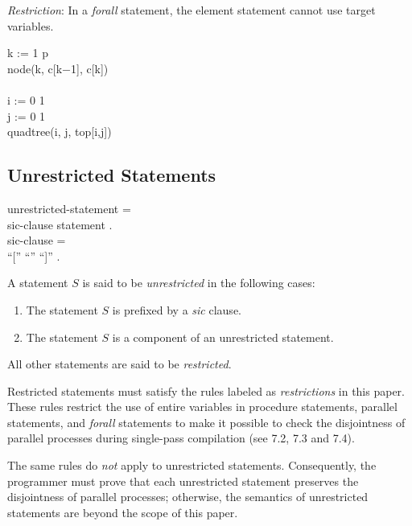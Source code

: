 {\it Restriction}: In a {\it forall} statement, the element
statement cannot use target variables.

\blankline

\examples

\begin{program}{11.8em}
  {\PA}{\Forall} k := 1 {\To} p {\Do}  \\
    {\PB}node(k, c[k$-$1], c[k])       \\
  {\PA}                                \\
  {\PA}{\Forall} i := 0 {\To} 1 {\Do}  \\
    {\PB}{\Forall} j := 0 {\To} 1 {\Do}\\
      {\PC}quadtree(i, j, top[i,j])
\end{program}


\subsection{Unrestricted Statements}

\begin{grammar}
  {\GA}unrestricted-statement =  \\
    {\GB}sic-clause statement .  \\
  {\GA}sic-clause =              \\
    {\GB}``['' ``{\Sic}'' ``]'' .\\
\end{grammar}

A statement $S$ is said to be {\it unrestricted} in the
following cases:

\begin{enumerate}
  \item
  The statement $S$ is prefixed by a {\it sic} clause.
  \item
  The statement $S$ is a component of an unrestricted
  statement.
\end{enumerate}

All other statements are said to be {\it restricted}.

Restricted statements must satisfy the rules labeled as
{\it restrictions} in this paper. These rules restrict the
use of entire variables in procedure statements, parallel
statements, and {\it forall} statements to make it possible
to check the disjointness of parallel processes during
single-pass compilation (see 7.2, 7.3 and 7.4).

The same rules do {\it not} apply to unrestricted
statements. Consequently, the programmer must prove that
each unrestricted statement preserves the disjointness of
parallel processes; otherwise, the semantics of unrestricted
statements are beyond the scope of this paper.

